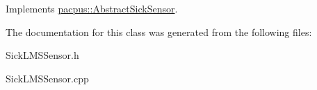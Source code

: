 Implements \hyperlink{classpacpus_1_1AbstractSickSensor_a14c6da8df61d91f2b63439df00fd5d6a}{pacpus\-::\-Abstract\-Sick\-Sensor}.



The documentation for this class was generated from the following files\-:\begin{DoxyCompactItemize}
\item 
Sick\-L\-M\-S\-Sensor.\-h\item 
Sick\-L\-M\-S\-Sensor.\-cpp\end{DoxyCompactItemize}
